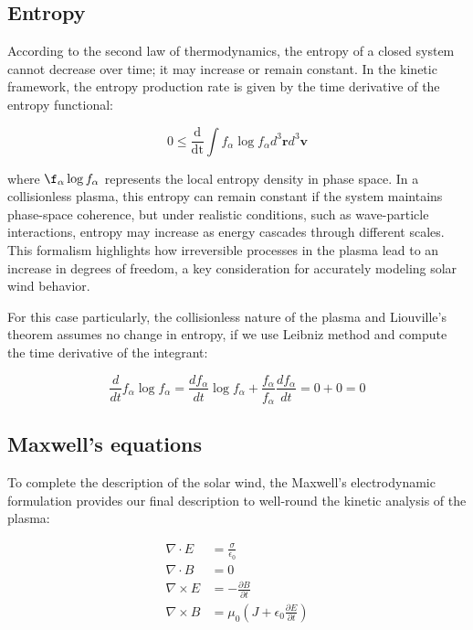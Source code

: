 \documentclass[12pt]{article}
\begin{document}
\subsection{Entropy}

According to the second law of thermodynamics, the entropy of a closed system cannot decrease over time; it may increase or remain constant. In the kinetic framework, the entropy production rate is given by the time derivative of the entropy functional:

\begin{equation}
    0 \leq \frac{\mathrm{d}}{\mathrm{dt}} \int f_\alpha \log f_\alpha d^3\mathbf{r} d^3\mathbf{v}
\end{equation}

where $\f_\alpha \log f_\alpha$ represents the local entropy density in phase space. In a collisionless plasma, this entropy can remain constant if the system maintains phase-space coherence, but under realistic conditions, such as wave-particle interactions, entropy may increase as energy cascades through different scales. This formalism highlights how irreversible processes in the plasma lead to an increase in degrees of freedom, a key consideration for accurately modeling solar wind behavior.

For this case particularly, the collisionless nature of the plasma and Liouville's theorem assumes no change in entropy, if we use Leibniz method and compute the time derivative of the integrant:

\begin{equation}
    \frac{d}{dt} f_\alpha \log f_\alpha = \frac{df_\alpha}{dt} \log f_\alpha + \frac{f_\alpha}{f_\alpha}\frac{df_\alpha}{dt} = 0 + 0 = 0
\end{equation}

\subsection{Maxwell's equations}

To complete the description of the solar wind, the Maxwell's electrodynamic formulation provides our final description to well-round the kinetic analysis of the plasma:

\begin{align*}
    \nabla \cdot E &= \frac{\sigma}{\epsilon_0} \\
    \nabla \cdot B &= 0 \\
    \nabla \times E &= - \frac{\partial B}{\partial t} \\
    \nabla \times B &= \mu_0 \left(J + \epsilon_0 \frac{\partial E}{\partial t}\right)
\end{align*}
\end{document}
